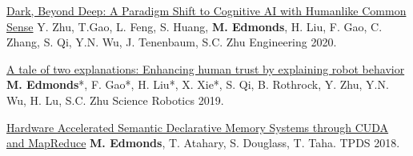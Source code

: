 


\begin{cvpublications}

\item \cvpublication
{\href{https://robotics.sciencemag.org/content/4/37/eaay4663}{Dark, Beyond Deep: A Paradigm Shift to Cognitive AI with Humanlike Common Sense}} %
{Y. Zhu, T.Gao, L. Feng, S. Huang, \textbf{M. Edmonds}, H. Liu, F. Gao, C. Zhang, S. Qi, Y.N. Wu, J. Tenenbaum, S.C. Zhu} %
{Engineering 2020.} %
{} %

\item \cvpublication
{\href{https://robotics.sciencemag.org/content/4/37/eaay4663}{A tale of two explanations: Enhancing human trust by explaining robot behavior}} %
{\textbf{M. Edmonds}*, F. Gao*, H. Liu*, X. Xie*, S. Qi, B. Rothrock, Y. Zhu, Y.N. Wu, H. Lu, S.C. Zhu} %
{Science Robotics 2019.} %
{} %

\item \cvpublication
{\href{http://www.mjedmonds.com/projects/DM/TPDS18_HADM_final.pdf}{Hardware Accelerated Semantic Declarative Memory Systems through CUDA and MapReduce}} %
{\textbf{M. Edmonds}, T. Atahary, S. Douglass, T. Taha.} %
{TPDS 2018.} %
{} %

\cvequalcontribution

\end{cvpublications}